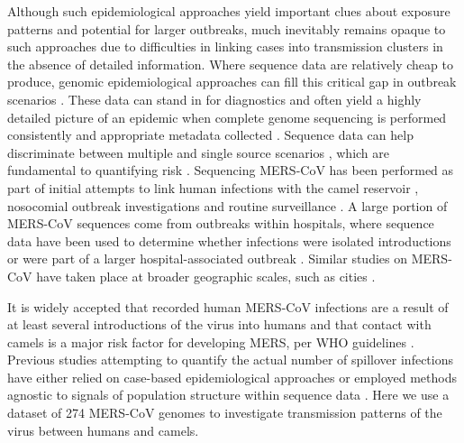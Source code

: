 \documentclass[11pt,oneside,letterpaper]{article}
\begin{document}
Although such epidemiological approaches yield important clues about exposure patterns and potential for larger outbreaks, much inevitably remains opaque to such approaches due to difficulties in linking cases into transmission clusters in the absence of detailed information.
Where sequence data are relatively cheap to produce, genomic epidemiological approaches can fill this critical gap in outbreak scenarios \citep{liu_h7n9_2013,gire_genomic_2014,grubaugh_multiple_2017}.
These data can stand in for diagnostics and often yield a highly detailed picture of an epidemic when complete genome sequencing is performed consistently and appropriate metadata collected \citep{dudas_virus_2017}.
Sequence data can help discriminate between multiple and single source scenarios \citep{gire_genomic_2014,quick_rapid_2015}, which are fundamental to quantifying risk \citep{grubaugh_multiple_2017}.
Sequencing MERS-CoV has been performed as part of initial attempts to link human infections with the camel reservoir \citep{memish_human_2014}, nosocomial outbreak investigations \citep{assiri_hospital_2013} and routine surveillance \citep{park_acute_2015}.
A large portion of MERS-CoV sequences come from outbreaks within hospitals, where sequence data have been used to determine whether infections were isolated introductions or were part of a larger hospital-associated outbreak \citep{fagbo_molecular_2015}.
Similar studies on MERS-CoV have taken place at broader geographic scales, such as cities \citep{cotten_2013}.


It is widely accepted that recorded human MERS-CoV infections are a result of at least several introductions of the virus into humans \citep{cotten_2013} and that contact with camels is a major risk factor for developing MERS, per WHO guidelines \citep{who_mers_guidelines_2016}.
Previous studies attempting to quantify the actual number of spillover infections have either relied on case-based epidemiological approaches \citep{cauchemez_unraveling_2016} or employed methods agnostic to signals of population structure within sequence data \citep{zhang_evolutionary_2016}.
Here we use a dataset of 274 MERS-CoV genomes to investigate transmission patterns of the virus between humans and camels.
\end{document}
